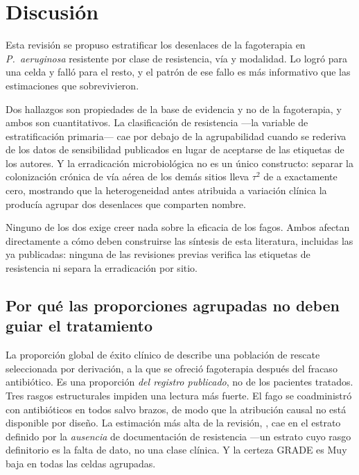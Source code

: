 \documentclass[12pt]{article}
\begin{document}
\section{Discusión}

Esta revisión se propuso estratificar los desenlaces de la fagoterapia en
\textit{P.\ aeruginosa} resistente por clase de resistencia, vía y modalidad. Lo
logró para una celda y falló para el resto, y el patrón de ese fallo es más
informativo que las estimaciones que sobrevivieron.

Dos hallazgos son propiedades de la base de evidencia y no de la fagoterapia, y
ambos son cuantitativos. La clasificación de resistencia ---la variable de
estratificación primaria--- cae por debajo de la agrupabilidad cuando se rederiva
de los datos de sensibilidad publicados en lugar de aceptarse de las etiquetas de
los autores. Y la erradicación microbiológica no es un único constructo: separar
la colonización crónica de vía aérea de los demás sitios lleva $\tau^2$ de
\EradFullTau a exactamente cero, mostrando que la heterogeneidad antes atribuida
a variación clínica la producía agrupar dos desenlaces que comparten nombre.

Ninguno de los dos exige creer nada sobre la eficacia de los fagos. Ambos afectan
directamente a cómo deben construirse las síntesis de esta literatura, incluidas
las ya publicadas: ninguna de las revisiones previas
\parencite{ElHaddad2019_eskape,Uyttebroek2022_lancetid,Liu2025_ijaa} verifica las
etiquetas de resistencia ni separa la erradicación por sitio.

\subsection*{Por qué las proporciones agrupadas no deben guiar el tratamiento}

La proporción global de éxito clínico de \CsOverallEst describe una población de
rescate seleccionada por derivación, a la que se ofreció fagoterapia después del
fracaso antibiótico. Es una proporción \emph{del registro publicado}, no de los
pacientes tratados. Tres rasgos estructurales impiden una lectura más fuerte. El
fago se coadministró con antibióticos en todos salvo \ModalityMonoArms brazos, de
modo que la atribución causal no está disponible por diseño. La estimación más
alta de la revisión, \CsResNotClassifiableEst, cae en el estrato definido por la
\emph{ausencia} de documentación de resistencia ---un estrato cuyo rasgo
definitorio es la falta de dato, no una clase clínica. Y la certeza GRADE es Muy
baja en todas las celdas agrupadas.
\end{document}
